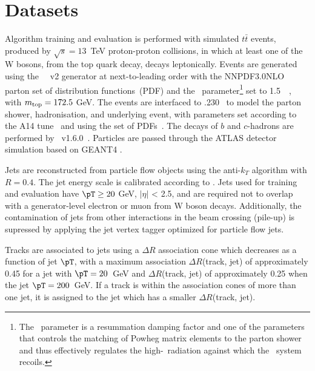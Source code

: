 \section{Datasets}
\label{sec:intro}

Algorithm training and evaluation is performed with simulated $t\bar{t}$ events, produced by $\sqrt{s} = 13$~TeV proton-proton collisions, in which at least one of the W bosons, from the top quark decay, decays leptonically. 
Events are generated using the
\powhegbox~\cite{Frixione:2007nw, Nason:2004rx, Frixione:2007vw, Alioli:2010xd}~v2
generator at next-to-leading order with the NNPDF3.0NLO~\cite{Ball:2014uwa} parton set
of distribution functions~(PDF) and the \hdamp\ parameter\footnote{The
  \hdamp\ parameter is a resummation damping factor and one of the
  parameters that controls the matching of Powheg matrix elements to
  the parton shower and thus effectively regulates the
  high-\pt\ radiation against which the \ttbar\ system recoils.} set
to 1.5~\mtop~\cite{ATL-PHYS-PUB-2016-020}, with $m_{\mathrm{top}} = 172.5$ GeV.  The events are interfaced
to \pythia.230~\cite{Sjostrand:2014zea} to model the parton shower,
hadronisation, and underlying event, with parameters set according
to the A14 tune~\cite{ATL-PHYS-PUB-2014-021} and using the \nnpdftwo
set of PDFs~\cite{Ball:2012cx}. The decays of $b$ and $c$-hadrons
are performed by \evtgen~v1.6.0~\cite{Lange:2001uf}.
Particles are passed through the ATLAS detector simulation \cite{SOFT-2010-01} based on GEANT4 \cite{Agostinelli:2002hh}.

Jets are reconstructed from particle flow objects \cite{PERF-2015-09} using the anti-$k_T$ algorithm \cite{Cacciari:2008gp} with $R=0.4$. 
The jet energy scale is calibrated according to \cite{PERF-2016-04}.
Jets used for training and evaluation have $\pT \geq 20$ GeV, $|\eta|$ < 2.5, and are required not to overlap with a generator-level electron or muon from W boson decays. 
Additionally, the contamination of jets from other interactions in the beam crossing (pile-up) is supressed by applying the jet vertex tagger \cite{ATLAS-CONF-2014-018} optimized for particle flow jets. 

Tracks are associated to jets using a $\Delta R$ association cone which decreases as a function of jet $\pT$, with a maximum association $\Delta R$(track, jet) of approximately 0.45 for a jet with $\pT = 20$~GeV and $\Delta R$(track, jet) of approximately 0.25 when the jet $\pT = 200$~GeV. 
If a track is within the association cones of more than one jet, it is assigned to the jet which has a smaller $\Delta R$(track, jet).

